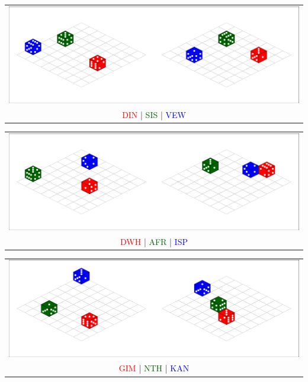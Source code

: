  \newpage


  \begin{center}
    \begin{tabular}{c}
      \includegraphics[width=0.8\linewidth]{diceRed02.png}
      \\
      \textcolor{red}{DIN} |
      \textcolor{darkGreen}{SIS} |
      \textcolor{blue}{VEW}
    \end{tabular}
  \end{center}


  \vfill


  \begin{center}
    \begin{tabular}{c}
      \includegraphics[width=0.8\linewidth]{diceRed01.png}
      \\
      \textcolor{red}{DWH} |
      \textcolor{darkGreen}{AFR} |
      \textcolor{blue}{ISP}
    \end{tabular}
  \end{center}


  \vfill


  \begin{center}
    \begin{tabular}{c}
      \includegraphics[width=0.8\linewidth]{diceBlue01.png}
      \\
      \textcolor{red}{GIM} |
      \textcolor{darkGreen}{NTH} |
      \textcolor{blue}{KAN}
    \end{tabular}
  \end{center}

\begin{center}
  \phLetterBox{}{}
  \phLetterBox{}{}
  \phLetterBox{}{}
  \phLetterBox{}{}
  \phLetterBox{}{}
  \phLetterBox{}{}
  \phLetterBox{}{}
  \phLetterBox{}{}
\end{center}
\begin{center}
  \phLetterBox{}{}
  \phLetterBox{}{}
  \phLetterBox{}{}
  \phLetterBox{}{}
  \phLetterBox{}{}
  \phLetterBox{}{}
  \phLetterBox{}{}
  \phLetterBox{}{}
\end{center}